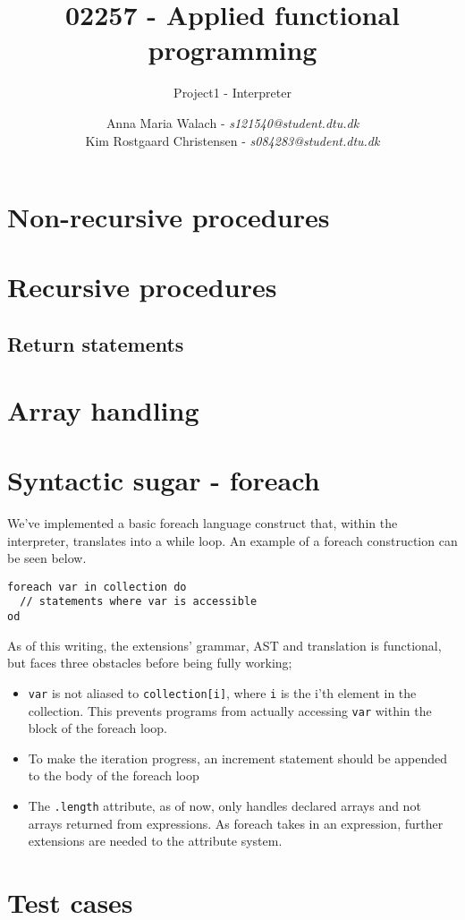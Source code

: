 \documentclass[11pt]{scrartcl}
\title{02257 - Applied functional programming}
\subtitle{Project1 - Interpreter}
\author{Anna Maria Walach - \textit {s121540@student.dtu.dk} \\ Kim Rostgaard Christensen - \textit {s084283@student.dtu.dk}}
\begin{document}
\maketitle
\section{Non-recursive procedures}

\section{Recursive procedures}
\subsection{Return statements}

\section{Array handling}

\section{Syntactic sugar - foreach}
We've implemented a basic foreach language construct that, within the interpreter, translates into a while loop. An example of a foreach construction can be seen below.
  \begin{lstlisting}
foreach var in collection do
  // statements where var is accessible
od
 \end{lstlisting}
 As of this writing, the extensions' grammar, AST and translation is functional, but faces three obstacles before being fully working;
 \begin{itemize}
   \item \texttt{var} is not aliased to \texttt{collection[i]}, where \texttt{i} is the i'th element in the collection. This prevents programs from actually accessing \texttt{var} within the block of the foreach loop.
   \item To make the iteration progress, an increment statement should be appended to the body of the foreach loop
   \item The \texttt{.length} attribute, as of now, only handles declared arrays and not arrays returned from expressions. As foreach takes in an expression, further extensions are needed to the attribute system. 
 \end{itemize}
   \section{Test cases}
\end{document}
